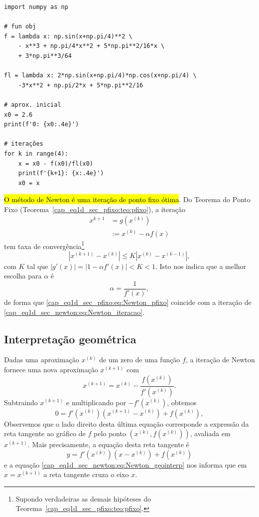 \begin{ex}
\begin{lstlisting}
import numpy as np

# fun obj
f = lambda x: np.sin(x+np.pi/4)**2 \
    - x**3 + np.pi/4*x**2 + 5*np.pi**2/16*x \
    + 3*np.pi**3/64

fl = lambda x: 2*np.sin(x+np.pi/4)*np.cos(x+np.pi/4) \
    -3*x**2 + np.pi/2*x + 5*np.pi**2/16

# aprox. inicial
x0 = 2.6
print(f'0: {x0:.4e}')

# iterações
for k in range(4):
    x = x0 - f(x0)/fl(x0)
    print(f'{k+1}: {x:.4e}')
    x0 = x
\end{lstlisting}
\end{ex}

\begin{obs}
  \hl{O método de Newton é uma iteração de ponto fixo ótima}. Do Teorema do Ponto Fixo (Teorema~\ref{cap_eq1d_sec_pfixo:teo:pfixo}), a iteração
  \begin{align}
    x^{k+1} &= g(x^{(k)})\\
            &:= x^{(k)} -\alpha f(x)\label{cap_eq1d_sec_pfixo:eq:Newton_pfixo}
  \end{align}
tem taxa de convergência\footnote{Supondo verdadeiras as demais hipóteses do Teorema~\ref{cap_eq1d_sec_pfixo:teo:pfixo}.}
\begin{equation}
  |x^{(k+1)}-x^{(k)}| \leq K |x^{(k)}-x^{(k-1)}|,
\end{equation}
com $K$ tal que $|g'(x)| = |1 - \alpha f'(x)| < K < 1$. Isto nos indica que a melhor escolha para $\alpha$ é
\begin{equation}
  \alpha = \frac{1}{f'(x)},
\end{equation}
de forma que \eqref{cap_eq1d_sec_pfixo:eq:Newton_pfixo} coincide com a iteração de \eqref{cap_eq1d_sec_newton:eq:Newton_iteracao}.
\end{obs}

\subsection{Interpretação geométrica}

Dadas uma aproximação $x^{(k)}$ de um zero de uma função $f$, a iteração de Newton fornece uma nova aproximação $x^{(k+1)}$ com
\begin{equation}
  x^{(k+1)} = x^{(k)} - \frac{f(x^{(k)})}{f'(x^{(k)})}.
\end{equation}
Subtraindo $x^{(k+1)}$ e multiplicando por $-f'(x^{(k)})$, obtemos
\begin{equation}\label{cap_eq1d_sec_newton:eq:Newton_geointerp}
  0 = f'(x^{(k)})(x^{(k+1)}-x^{(k)}) + f(x^{(k)}),
\end{equation}
Observemos que o lado direito desta última equação corresponde a expressão da reta tangente ao gráfico de $f$ pelo ponto $(x^{(k)}, f(x^{(k)}))$, avaliada em $x^{(k+1)}$. Mais precisamente, a equação desta reta tangente é
\begin{equation}
  y = f'(x^{(k)})(x-x^{(k)}) + f(x^{(k)})
\end{equation}
e a equação \eqref{cap_eq1d_sec_newton:eq:Newton_geointerp} nos informa que em $x=x^{(k+1)}$ a reta tangente cruza o eixo $x$.


